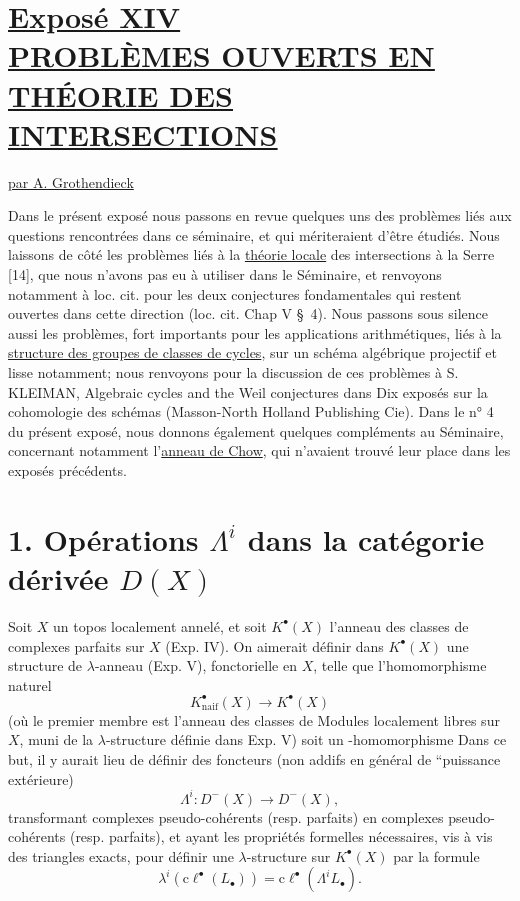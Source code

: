 
\section*{\underline{Exposé XIV}\\[3pt] \underline{\underline{PROBLÈMES OUVERTS EN THÉORIE DES INTERSECTIONS}}}
\begin{center}
\underline{par A. Grothendieck}
\end{center}

Dans le présent exposé nous passons en revue quelques uns des problèmes liés aux questions rencontrées dans ce séminaire, et qui mériteraient d'être étudiés. Nous laissons de côté les problèmes liés à la \uline{théorie locale} des intersections à la Serre [14], que nous n'avons pas eu à utiliser dans le Séminaire, et renvoyons notamment à loc. cit. pour les deux conjectures fondamentales qui restent ouvertes dans cette direction (loc. cit. Chap V \S~4). Nous passons sous silence aussi les problèmes, fort importants pour les applications arithmétiques, liés à la \uline{structure des groupes de classes de cycles}, sur un schéma algébrique projectif et lisse notamment; nous renvoyons pour la discussion de ces problèmes à S. KLEIMAN, Algebraic cycles and the Weil conjectures dans Dix exposés sur la cohomologie des schémas (Masson-North Holland Publishing Cie). Dans le n° 4 du présent exposé, nous donnons également quelques compléments au Séminaire, concernant notamment l'\uline{anneau de Chow}, qui n'avaient trouvé leur place dans les exposés précédents.

\section*{1. Opérations $\Lambda^i$ dans la catégorie dérivée $D(X)$\SGAAuthorFootMark{*}}

Soit $X$ un topos localement annelé, et soit $K^\bullet(X)$ l'anneau des classes de complexes parfaits sur $X$ (Exp. IV). On aimerait définir dans $K^\bullet(X)$ une structure de $\lambda$-anneau (Exp. V), fonctorielle en $X$, telle que l'homomorphisme naturel
\[
 K^\bullet_{\mathrm{naif}}(X)\longrightarrow K^\bullet(X)
\]
(où le premier membre est l'anneau des classes de Modules localement libres sur $X$, muni de la $\lambda$-structure définie dans Exp. V) soit un -homomorphisme Dans ce but, il y aurait lieu de définir des foncteurs (non addifs en général de ``puissance extérieure)
\[
 \Lambda^i:D^-(X)\longrightarrow D^-(X),
\]
transformant complexes pseudo-cohérents (resp. parfaits) en complexes pseudo-cohérents (resp. parfaits), et ayant les propriétés formelles nécessaires, vis à vis des triangles exacts, pour définir une $\lambda$-structure sur $K^\bullet(X)$ par la formule
\begin{equation}\tag{1.1}
 \lambda^i(\mathrm{c}\ell^\bullet(L_\bullet))=\mathrm{c}\ell^\bullet(\Lambda^i L_\bullet).
\end{equation}


